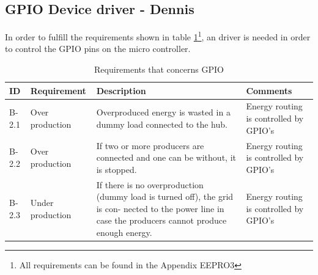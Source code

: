 \subsection{GPIO Device driver - Dennis}
In order to fulfill the requirements shown in table \ref{tab:gpio_req}\footnote{All requirements can be found in the Appendix EEPRO3}, an driver is needed in order to control the GPIO pins on the micro controller. 
\begin{table}[H]
\centering
	\begin{tabular}{|p{1.2cm}|p{2.8cm}|p{8cm}|p{3.5cm}|}
	\hline
	ID		& Requirement		& Description												& Comments\\\hline
	B-2.1	& Over production & Overproduced energy is wasted in a dummy load connected to the hub. & Energy routing is controlled by GPIO's \\\hline
	B-2.2	& Over production & If two or more producers are connected and one can be without, it is stopped. & Energy routing is controlled by GPIO's \\\hline
	B-2.3	& Under production & If there is no overproduction (dummy load is turned off), the grid is con- nected to the power line in case the producers cannot produce enough energy. & Energy routing is controlled by GPIO's \\\hline
	\end{tabular}
	\caption{Requirements that concerns GPIO}
	\label{tab:gpio_req}
\end{table}
%
